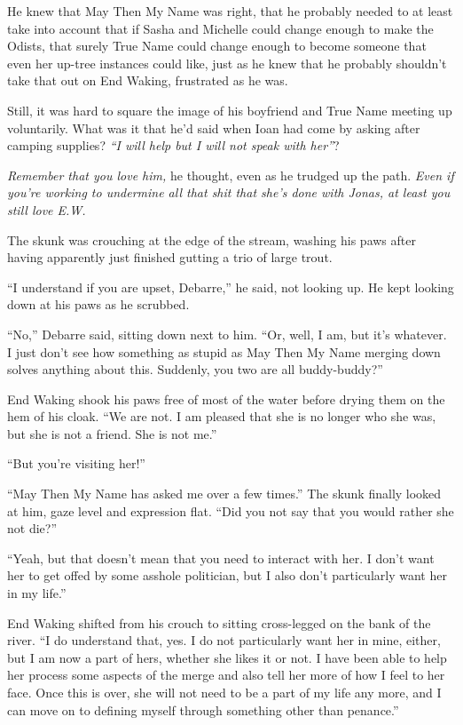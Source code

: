 He knew that May Then My Name was right, that he probably needed to at least take into account that if Sasha and Michelle could change enough to make the Odists, that surely True Name could change enough to become someone that even her up-tree instances could like, just as he knew that he probably shouldn't take that out on End Waking, frustrated as he was.

Still, it was hard to square the image of his boyfriend and True Name meeting up voluntarily. What was it that he'd said when Ioan had come by asking after camping supplies? \emph{``I will help but I will not speak with her''}?

\emph{Remember that you love him,} he thought, even as he trudged up the path. \emph{Even if you're working to undermine all that shit that she's done with Jonas, at least you still love E.W.}

The skunk was crouching at the edge of the stream, washing his paws after having apparently just finished gutting a trio of large trout.

``I understand if you are upset, Debarre,'' he said, not looking up. He kept looking down at his paws as he scrubbed.

``No,'' Debarre said, sitting down next to him. ``Or, well, I am, but it's whatever. I just don't see how something as stupid as May Then My Name merging down solves anything about this. Suddenly, you two are all buddy-buddy?''

End Waking shook his paws free of most of the water before drying them on the hem of his cloak. ``We are not. I am pleased that she is no longer who she was, but she is not a friend. She is not me.''

``But you're visiting her!''

``May Then My Name has asked me over a few times.'' The skunk finally looked at him, gaze level and expression flat. ``Did you not say that you would rather she not die?''

``Yeah, but that doesn't mean that you need to interact with her. I don't want her to get offed by some asshole politician, but I also don't particularly want her in my life.''

End Waking shifted from his crouch to sitting cross-legged on the bank of the river. ``I do understand that, yes. I do not particularly want her in mine, either, but I am now a part of hers, whether she likes it or not. I have been able to help her process some aspects of the merge and also tell her more of how I feel to her face. Once this is over, she will not need to be a part of my life any more, and I can move on to defining myself through something other than penance.''

